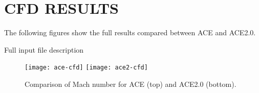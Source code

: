 %
%	 
%


\chapter{CFD RESULTS}
\label{appendix:cfd}

The following figures show the full results compared between ACE and ACE2.0.

Full input file description

\begin{figure}[ht!]
    \centering
    \texttt{[image: ace-cfd]}
    \texttt{[image: ace2-cfd]}
    \caption{Comparison of Mach number for ACE (top) and ACE2.0 (bottom).}
    \label{fig:cfd-comparison}
\end{figure}

